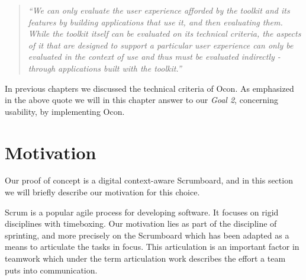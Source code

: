 \documentclass[../report.tex]{subfiles}
\begin{document}
\graphicspath{{img/}{../img/}}




\blockquote{
\textit{``We can only evaluate the user experience afforded by the toolkit and its features by building applications that use it, and then evaluating them. While the toolkit itself can be evaluated on its technical criteria, the aspects of it that are designed to support a particular user experience can only be evaluated in the context of use and thus must be evaluated indirectly - through applications built with the toolkit.''} \cite{Infrastructure (2003)} \\}

In previous chapters we discussed the technical criteria of Ocon. As emphasized in the above quote we will in this chapter answer to our \textit{Goal 2}, concerning usability, by implementing Ocon.

\section{Motivation}

Our proof of concept is a digital context-aware Scrumboard, and in this section we will briefly describe our motivation for this choice.





Scrum is a popular agile process for developing software. It focuses on rigid disciplines with timeboxing. Our motivation lies as part of the discipline of sprinting, and more precisely on the Scrumboard which has been adapted as a means to articulate the tasks in focus. This articulation is an important factor in teamwork which under the term articulation work describes the effort a team puts into communication.
\end{document}
